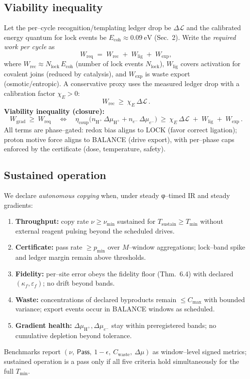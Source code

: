 \documentclass[11pt]{article}
\begin{document}
\subsection{Viability inequality}\label{sec:viability}
Let the per–cycle recognition/templating ledger drop be $\Delta \mathcal{L}$ and the calibrated energy quantum for lock events be $E_{\mathrm{coh}}\approx 0.09~\mathrm{eV}$ (Sec.~2). Write the \emph{required work per cycle} as
\[
W_{\mathrm{req}}\;=\;W_{\mathrm{rec}}\;+\;W_{\mathrm{lig}}\;+\;W_{\mathrm{exp}},
\]
where $W_{\mathrm{rec}}\approx N_{\mathrm{lock}}\,E_{\mathrm{coh}}$ (number of lock events $N_{\mathrm{lock}}$), $W_{\mathrm{lig}}$ covers activation for covalent joins (reduced by catalysis), and $W_{\mathrm{exp}}$ is waste export (osmotic/entropic). A conservative proxy uses the measured ledger drop with a calibration factor $\chi_E>0$:
\[
W_{\mathrm{rec}}\ \ge\ \chi_E\,\Delta \mathcal{L}\,.
\]
\textbf{Viability inequality (closure):}
\begin{equation}\label{eq:closure}
W_{\mathrm{grad}}\ \ge\ W_{\mathrm{req}}
\quad\Longleftrightarrow\quad
\eta_{\mathrm{coup}}\Big(n_{\mathrm{H}^+}\,\Delta \mu_{\mathrm{H}^+}+n_{e^-}\,\Delta \mu_{e^-}\Big)
\ \ge\ 
\chi_E\,\Delta \mathcal{L}\;+\;W_{\mathrm{lig}}\;+\;W_{\mathrm{exp}}\,.
\end{equation}
All terms are phase–gated: redox bias aligns to \textsf{LOCK} (favor correct ligation); proton motive force aligns to \textsf{BALANCE} (drive export), with per–phase caps enforced by the certificate (dose, temperature, safety).

\subsection{Sustained operation}\label{sec:sustained}
We declare \emph{autonomous copying} when, under steady φ–timed IR and steady gradients:
\begin{enumerate}
\item \textbf{Throughput:} copy rate $\nu\ge \nu_{\min}$ sustained for $T_{\mathrm{sustain}}\ge T_{\min}$ without external reagent pulsing beyond the scheduled drives.
\item \textbf{Certificate:} pass rate $\ge p_{\min}$ over $M$–window aggregations; lock–band spike and ledger margin remain above thresholds.
\item \textbf{Fidelity:} per–site error obeys the fidelity floor (Thm.~6.4) with declared $(\kappa_f,\varepsilon_f)$; no drift beyond bands.
\item \textbf{Waste:} concentrations of declared byproducts remain $\le C_{\max}$ with bounded variance; export events occur in \textsf{BALANCE} windows as scheduled.
\item \textbf{Gradient health:} $\Delta\mu_{\mathrm{H}^+},\Delta\mu_{e^-}$ stay within preregistered bands; no cumulative depletion beyond tolerance.
\end{enumerate}
Benchmarks report $(\nu,\ \textsf{Pass},\ 1-\epsilon,\ C_{\mathrm{waste}},\ \Delta\mu)$ as window–level signed metrics; sustained operation is a pass only if all five criteria hold simultaneously for the full $T_{\min}$.
\end{document}
